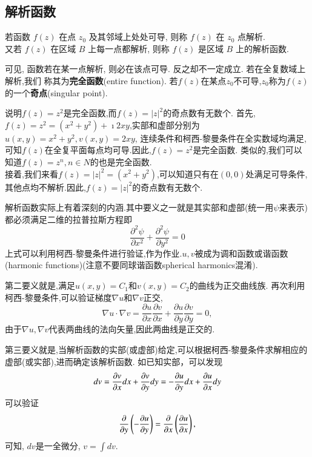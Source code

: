 \subsection{解析函数}
\begin{definition}
若函数 $f(z)$ 在点 $z_0$ 及其邻域上处处可导, 则称 $f(z)$ 在 $z_0$ 点解析.\\
 又若 $f(z)$ 在区域 $B$ 上每一点都解析, 则称 $f(z)$ 是区域 $B$ 上的解析函数.
\end{definition} 
 可见, 函数若在某一点解析, 则必在该点可导. 反之却不一定成立. 若在全复数域上解析,我们
 称其为{\bf 完全函数}(entire function).
 若$f(z)$在某点$z_0$不可导,$z_0$称为$f(z)$的一个{\bf 奇点}(singular point).

 \begin{examplebox}{说明$f(z)=z^2$是完全函数,而$f(z)=|z|^2$的奇点数有无数个.}
    首先,$f(z) =z^2 = (x^2 + y ^2) + \imath 2 x y$,实部和虚部分别为$u(x,y) = x^2+ y^2, v(x,y)=2x y$,
连续条件和柯西-黎曼条件在全实数域均满足,可知$f(z)$在全复平面每点均可导.因此,$f(z)=z^2$是完全函数.
类似的,我们可以知道$f(z)=z^n, n\in N$的也是完全函数.\\
    接着,我们来看$f(z) = |z|^2 = (x^2 + y ^2)$,可以知道只有在$(0,0)$处满足可导条件,其他点均不解析.因此,$f(z)=|z|^2$的奇点数有无数个.
 \end{examplebox}

 解析函数实际上有着深刻的内涵.其中要义之一就是其实部和虚部(统一用$\psi$来表示)都必须满足二维的拉普拉斯方程即
 \begin{equation}
    \label{eq:Laplace_eq}
    \frac{\partial^2 \psi}{\partial x^2}+\frac{\partial^2 \psi}{\partial y^2}=0
 \end{equation}
上式可以利用柯西-黎曼条件进行验证,作为作业.$u,v$被成为调和函数或谐函数(harmonic functions)(注意不要同球谐函数spherical harmonics混淆).

第二要义就是,满足$u(x,y) = C_1$和$v(x,y)= C_2$的曲线为正交曲线族.
再次利用柯西-黎曼条件,可以验证梯度$\nabla u $和$\nabla v$正交,
\begin{equation}
    \nabla u \cdot \nabla v = \frac{\partial u}{\partial x} 
    \frac{\partial v}{\partial x}+\frac{\partial u}{\partial y} \frac{\partial v}{\partial y}=0 ,
\end{equation}
由于$\nabla u, \nabla v$代表两曲线的法向矢量,因此两曲线是正交的.

第三要义就是,当解析函数的实部(或虚部)给定,可以根据柯西-黎曼条件求解相应的虚部(或实部),进而确定该解析函数.
如已知实部，可以发现
\begin{equation}
    d v = \frac{\partial{v}}{\partial{x}} dx + \frac{\partial{v}}{\partial{y}} dy = -\frac{\partial{u}}{\partial{y}} dx + \frac{\partial{u}}{\partial{x}} dy
\end{equation}
可以验证 
$$
\frac{\partial{}}{\partial{y}} \left( - \frac{\partial{u}}{\partial{y}} \right) = \frac{\partial{}}{\partial{x}} \left( \frac{\partial{u}}{\partial{x}} \right) , 
$$
可知, $dv$是一全微分, $v = \int dv$.

